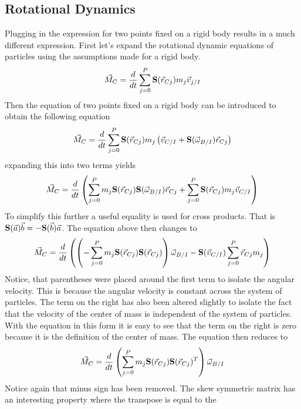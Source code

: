 \documentclass{article}
\begin{document}
\subsection{Rotational Dynamics}
Plugging in the expression for two points fixed on a rigid body
results in a much different expression. First let's expand the
rotational dynamic equations of particles using the assumptions made
for a rigid body.
\begin{equation}
\vec{M}_C = \frac{d}{dt}\sum\limits_{j=0}^P {\bf S}(\vec{r}_{Cj}) m_j\vec{v}_{j/I}
\end{equation}
Then the equation of two points fixed on a rigid body can be
introduced to obtain the following equation
\begin{equation}
\vec{M}_C = \frac{d}{dt}\sum\limits_{j=0}^P {\bf S}(\vec{r}_{Cj}) m_j\left(\vec{v}_{C/I} + {\bf S}(\vec{\omega}_{B/I}) \vec{r}_{Cj}\right)
\end{equation}
expanding this into two terms yields
\begin{equation}
\vec{M}_C =  \frac{d}{dt}\left(\sum\limits_{j=0}^P m_j{\bf S}(\vec{r}_{Cj}) {\bf S}(\vec{\omega}_{B/I}) \vec{r}_{Cj} + \sum\limits_{j=0}^P {\bf S}(\vec{r}_{Cj})m_j\vec{v}_{C/I}\right)
\end{equation}
To simplify this further a useful equality is used for cross
products. That is ${\bf S}(\vec{a})\vec{b}=-{\bf
  S}(\vec{b})\vec{a}$. The equation above then changes to
\begin{equation}
\vec{M}_C =  \frac{d}{dt}\left(\left(-\sum\limits_{j=0}^P m_j{\bf S}(\vec{r}_{Cj}){\bf
  S}(\vec{r}_{Cj})\right)\vec{\omega}_{B/I} - {\bf S}(\vec{v}_{C/I})
\sum\limits_{j=0}^P \vec{r}_{Cj}m_j\right)
\end{equation}
Notice, that parentheses were placed around the first term to isolate
the angular velocity. This is because the angular velocity is constant
across the system of particles. The term on the right has also been
altered slightly to isolate the fact that the velocity of the center
of mass is independent of the system of particles. With the equation
in this form it is easy to see that the term on the right is zero
because it is the definition of the center of mass. The equation then
reduces to 
\begin{equation}
\vec{M}_C =  \frac{d}{dt}\left(\sum\limits_{j=0}^P m_j{\bf S}(\vec{r}_{Cj}){\bf
  S}(\vec{r}_{Cj})^T\right)\vec{\omega}_{B/I} 
\end{equation}
Notice again that minus sign has been removed. The skew symmetric
matrix has an interesting property where the transpose is equal to the
\end{document}
